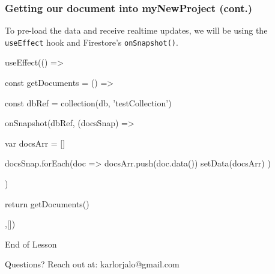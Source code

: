 \documentclass{beamer}
\begin{document}
  \begin{frame}[fragile]
    \frametitle{Getting our document into myNewProject (cont.)}
    To pre-load the data and receive realtime updates, we will be using the \verb|useEffect| hook and Firestore's \verb|onSnapshot()|. 

    \begin{jscodesmall}
useEffect(() => {
  const getDocuments = () => {

    const dbRef = collection(db, 'testCollection')
  
    onSnapshot(dbRef, (docsSnap) => {
      var docsArr = []

      docsSnap.forEach(doc => {
        docsArr.push(doc.data())
        setData(docsArr)
      })
    })
  }

  return getDocuments()
},[])
    \end{jscodesmall}
  \end{frame}

  


  \appendix

  \begin{frame}[standout]
    End of Lesson

    {\small Questions? Reach out at:}
    {\footnotesize karlorjalo@gmail.com}
  \end{frame}
\end{document}
